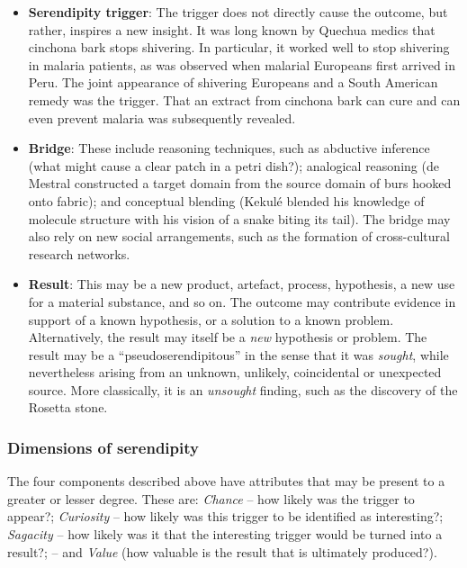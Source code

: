 \begin{itemize}
\item \textbf{Serendipity trigger}: The trigger does not directly
  cause the outcome, but rather, inspires a new insight.  It was long
  known by Quechua medics that cinchona bark stops shivering.  In
  particular, it worked well to stop shivering in malaria patients, as
  was observed when malarial Europeans first arrived in Peru.  The
  joint appearance of shivering Europeans and a South American remedy
  was the trigger.  That an extract from cinchona bark can cure and
  can even prevent malaria was subsequently revealed.
\end{itemize}

\begin{itemize}
\item \textbf{Bridge}: These include reasoning techniques, such as
  abductive inference (what might cause a clear patch in a petri
  dish?); analogical reasoning (de Mestral constructed a target domain
  from the source domain of burs hooked onto fabric); and conceptual
  blending (Kekul\'e blended his knowledge of molecule structure with
  his vision of a snake biting its tail).  The bridge may also rely on
  new social arrangements, such as the formation of cross-cultural
  research networks.
\end{itemize}

\begin{itemize}
\item \textbf{Result}: This may be a new product, artefact, process,
  hypothesis, a new use for a material substance, and so on.  The
  outcome may contribute evidence in support of a known hypothesis, or
  a solution to a known problem.  Alternatively, the result may itself
  be a {\em new} hypothesis or problem.  The result may be a
  ``pseudoserendipitous'' in the sense that it was {\em sought}, while
  nevertheless arising from an unknown, unlikely, coincidental or
  unexpected source.  More classically, it is an \emph{unsought}
  finding, such as the discovery of the Rosetta stone.
\end{itemize}

\subsubsection*{Dimensions of serendipity}

The four components described above have attributes that may be present to a greater or lesser degree.  These are: \emph{Chance} -- how likely was the trigger to appear?; \emph{Curiosity} -- how likely was this trigger to be identified as interesting?; \emph{Sagacity} -- how likely was it that the interesting trigger would be turned into a result?; -- and \emph{Value} (how valuable is the result that is ultimately produced?).

